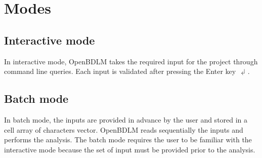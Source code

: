 \section{Modes}
\label{S:OPENBDLMRUNNINGMODES}

\subsection{Interactive mode}
\label{SS:InteractiveMode}

In interactive mode, OpenBDLM takes the required input for the project through \MATLAB{} command line queries.
Each input is validated after pressing the Enter key $\dlsh$.

\subsection{Batch mode}
\label{SS:Batchmode}

In batch mode, the inputs are provided in advance by the user and stored in a cell array of characters vector.
OpenBDLM reads sequentially the inputs and performs the analysis.  %
The batch mode requires the user to be familiar with the interactive mode because the set of input must be provided prior to the analysis.